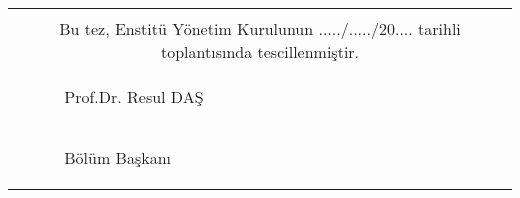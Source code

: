 \begin{titlepage}
\begin{table}[ht!]
\begin{tabular}{ p{} p{}}
%
%
%
&\\[10pt]
				 \multicolumn{2}{c}{\hspace{2.5cm}\footnotesize Bu tez, Enstitü Yönetim Kurulunun ...../...../20.... tarihli toplantısında tescillenmiştir.}\\		
				& {\begin{center}
						\hspace{-1cm}\small Prof.Dr. Resul DAŞ
				\end{center}}			\\[-35pt]					            
				& {\begin{center}
						\hspace{-1cm}\small Bölüm Başkanı
				\end{center}}				\\[-35pt]
							
\end{tabular}

\end{table}



\end{titlepage}
\restoregeometry
\newpage
